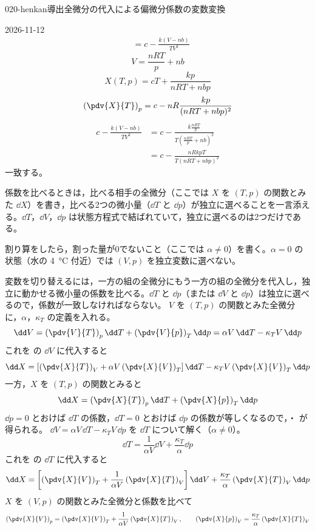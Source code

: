\documentclass[uplatex,dvipdfmx,a4paper,11pt]{jsarticle}
\begin{document}
\begin{mondai}{020-henkan}{導出}{全微分の代入による偏微分係数の変数変換}
\begin{kotaeutsushi}{2026-11-12}
\begin{align*}
&=c-\frac{k(V-nb)}{TV^{2}}
\end{align*}
\[ V=\frac{nRT}{p}+nb \]
\[ X(T,p)=cT+\frac{kp}{nRT+nbp} \]
\[ \left(\pdv{X}{T}\right)_{p}=c-nR\frac{kp}{(nRT+nbp)^{2}} \]
\begin{align*}
c-\frac{k(V-nb)}{TV^{2}}&=c-\frac{k\frac{nRT}{p}}{T\left(\frac{nRT}{p}+nb\right)^{2}}\\
&=c-\frac{nRkpT}{T(nRT+nbp)^{2}}
\end{align*}
一致する。
\end{kotaeutsushi}
\begin{kizuki}
\item 係数を比べるときは，比べる相手の全微分（ここでは $X$ を $(T,p)$ の関数とみた $\dd X$）を書き，比べる2つの微小量（$\dd T$ と $\dd p$）が独立に選べることを一言添える。$\dd T$，$\dd V$，$\dd p$ は状態方程式で結ばれていて，独立に選べるのは2つだけである。
\item 割り算をしたら，割った量が0でないこと（ここでは $\alpha\neq0$）を書く。$\alpha=0$ の状態（水の \qty{4}{\degreeCelsius} 付近）では $(V,p)$ を独立変数に選べない。
\end{kizuki}
\begin{tadashii}
\houshin 変数を切り替えるには，一方の組の全微分にもう一方の組の全微分を代入し，独立に動かせる微小量の係数を比べる。$\dd T$ と $\dd p$（または $\dd V$ と $\dd p$）は独立に選べるので，係数が一致しなければならない。
\keisan {} $V$ を $(T,p)$ の関数とみた全微分に，$\alpha$，$\kappa_{T}$ の定義を入れる。
\[ \dd V = \left(\pdv{V}{T}\right)_{p}\dd T + \left(\pdv{V}{p}\right)_{T}\dd p = \alpha V\,\dd T - \kappa_{T}V\,\dd p \]
これを  の $\dd V$ に代入すると
\[ \dd X = \left[\left(\pdv{X}{T}\right)_{V} + \alpha V\left(\pdv{X}{V}\right)_{T}\right]\dd T - \kappa_{T}V\left(\pdv{X}{V}\right)_{T}\dd p \]
一方，$X$ を $(T,p)$ の関数とみると
\[ \dd X = \left(\pdv{X}{T}\right)_{p}\dd T + \left(\pdv{X}{p}\right)_{T}\dd p \]
$\dd p = 0$ とおけば $\dd T$ の係数，$\dd T = 0$ とおけば $\dd p$ の係数が等しくなるので，・ が得られる。
 $\dd V = \alpha V\,\dd T - \kappa_{T}V\,\dd p$ を $\dd T$ について解く（$\alpha \neq 0$）。
\[ \dd T = \frac{1}{\alpha V}\dd V + \frac{\kappa_{T}}{\alpha}\dd p \]
これを  の $\dd T$ に代入すると
\[ \dd X = \left[\left(\pdv{X}{V}\right)_{T} + \frac{1}{\alpha V}\left(\pdv{X}{T}\right)_{V}\right]\dd V + \frac{\kappa_{T}}{\alpha}\left(\pdv{X}{T}\right)_{V}\dd p \]
$X$ を $(V,p)$ の関数とみた全微分と係数を比べて
\[ \left(\pdv{X}{V}\right)_{p} = \left(\pdv{X}{V}\right)_{T} + \frac{1}{\alpha V}\left(\pdv{X}{T}\right)_{V}, \qquad \left(\pdv{X}{p}\right)_{V} = \frac{\kappa_{T}}{\alpha}\left(\pdv{X}{T}\right)_{V} \]

\end{tadashii}
\end{mondai}
\end{document}
